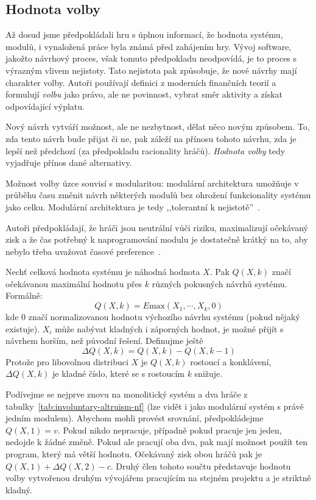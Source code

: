 \begin{multicols}{2}
	\subsection*{Hodnota volby}
		Až dosud jsme předpokládali hru s úplnou informací, že hodnota systému, modulů, i vynaložená práce byla známá před zahájením hry. Vývoj software, jakožto návrhový proces, však tomuto předpokladu neodpovídá, je to proces s výrazným vlivem nejistoty. Tato nejistota pak způsobuje, že nové návrhy mají charakter volby. Autoři používají definici z moderních finančních teorií a formulují {\em volbu} jako právo, ale ne povinnost, vybrat směr aktivity a získat odpovídající výplatu.

		Nový návrh vytváří možnost, ale ne nezbytnost, dělat něco novým způsobem. To, zda tento návrh bude přijat či ne, pak záleží na přínosu tohoto návrhu, zda je lepší než předchozí (za předpokladu racionality hráčů). {\em Hodnota volby} tedy vyjadřuje přínos dané alternativy.

		Možnost volby úzce souvisí s modularitou: modulární architektura umožňuje v průběhu času změnit návrh některých modulů bez ohrožení funkcionality systému jako celku. Modulární architektura je tedy ,,tolerantní k nejistotě''~\cite[kap. 2.2]{architecture-opensource}.

		Autoři předpokládají, že hráči jsou neutrální vůči riziku, maximalizují očekávaný zisk a že čas potřebný k naprogramování modulu je dostatečně krátký na to, aby nebylo třeba uvažovat časové preference~\cite[kap. 5]{architecture-opensource}.

		Nechť celková hodnota systému je náhodná hodnota $X$. Pak $Q(X, k)$ značí očekávanou maximální hodnotu přes $k$ různých pokusných návrhů systému. Formálně:
		$$Q(X, k) = E\text{max}(X_1, \cdots, X_k, 0)$$
		kde $0$ značí normalizovanou hodnotu výchozího návrhu systému (pokud nějaký existuje). $X_i$ může nabývat kladných i záporných hodnot, je možné přijít s návrhem horším, než původní řešení. Definujme ještě
		$$\Delta Q(X, k) = Q(X,k) - Q(X, k-1)$$
		Protože pro libovolnou distribuci $X$ je $Q(X,k)$ rostoucí a konklávení, $\Delta Q(X,k)$ je kladné číslo, které se s rostoucím $k$ snižuje.

		Podívejme se nejprve znovu na monolitický systém a dva hráče z tabulky~\ref{tab:involuntary-altruism-nf} (lze vidět i jako modulární systém s právě jedním modulem). Abychom mohli provést srovnání, předpokládejme $Q(X, 1) = v$. Pokud nikdo nepracuje, případně pokud pracuje jen jeden, nedojde k žádné změně. Pokud ale pracují oba dva, pak mají možnost použít ten program, který má větší hodnotu. Očekávaný zisk obou hráčů pak je $Q(X, 1) + \Delta Q(X,2) - c$. Druhý člen tohoto součtu představuje hodnotu volby vytvořenou druhým vývojářem pracujícím na stejném projektu a je striktně kladný.


\end{multicols}
